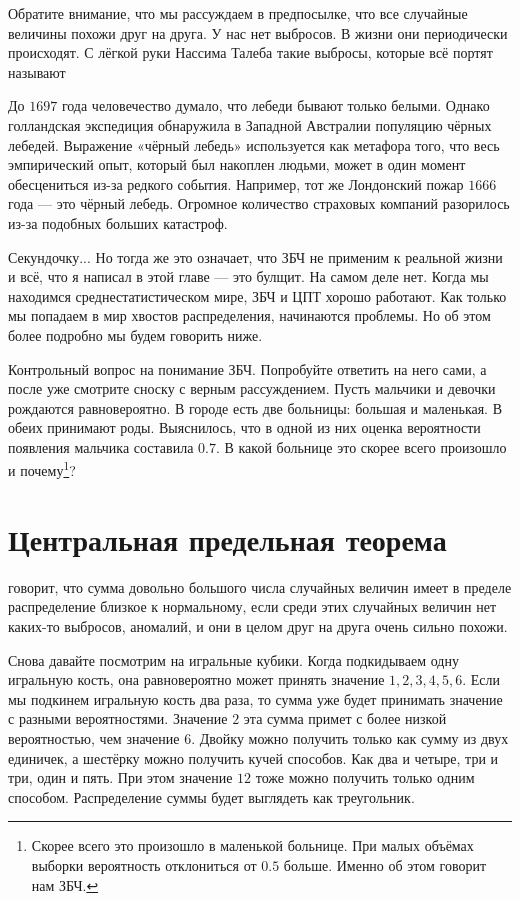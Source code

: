 \documentclass[12pt, a4paper, oneside]{article}
\begin{document}
Обратите внимание, что мы рассуждаем в предпосылке, что все случайные величины похожи друг на друга. У нас нет выбросов. В жизни они периодически происходят. С лёгкой руки Нассима Талеба такие выбросы, которые всё портят называют  

До $1697$ года человечество думало, что лебеди бывают только белыми. Однако голландская экспедиция обнаружила в Западной Австралии популяцию чёрных лебедей. Выражение «чёрный лебедь» используется как метафора того, что весь эмпирический опыт, который был накоплен людьми, может в один момент обесцениться из-за редкого события. Например, тот же Лондонский пожар $1666$ года --- это чёрный лебедь. Огромное количество страховых компаний разорилось из-за подобных больших катастроф. 

Секундочку... Но тогда же это означает, что ЗБЧ не применим к реальной жизни и всё, что я написал в этой главе --- это булщит. На самом деле нет. Когда мы находимся среднестатистическом мире,  ЗБЧ и ЦПТ хорошо работают. Как только мы попадаем в мир хвостов распределения,  начинаются проблемы. Но об этом более подробно мы будем говорить ниже. 

Контрольный вопрос на понимание ЗБЧ. Попробуйте ответить на него сами, а после уже смотрите сноску с верным рассуждением. Пусть мальчики и девочки рождаются равновероятно. В городе есть две больницы: большая и маленькая. В обеих принимают роды. Выяснилось, что в одной из них оценка вероятности появления мальчика составила $0.7$. В какой больнице это скорее всего произошло и почему\footnote{Скорее всего это произошло в маленькой больнице. При малых объёмах выборки вероятность отклониться от $0.5$ больше. Именно об этом говорит нам ЗБЧ.}?


\section{Центральная предельная теорема}

 говорит, что сумма довольно большого числа случайных величин имеет в пределе распределение близкое к нормальному, если среди этих случайных величин нет каких-то выбросов, аномалий, и они в целом друг на друга очень сильно похожи.

Снова давайте посмотрим на игральные кубики. Когда подкидываем одну игральную кость, она равновероятно может принять значение $1, 2, 3, 4, 5, 6$. Если мы подкинем игральную кость два раза, то сумма уже будет принимать значение с разными вероятностями.  Значение $2$ эта сумма примет с более низкой вероятностью, чем значение $6$. Двойку можно получить только как сумму из двух единичек, а шестёрку можно получить кучей способов. Как два и четыре, три и три, один и пять.  При этом значение $12$ тоже можно получить только одним способом. Распределение суммы будет выглядеть как треугольник. 
\end{document}
